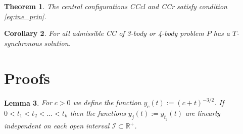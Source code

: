 \documentclass[twoside]{article}
\newtheorem{thm}{Theorem}[section]
\newtheorem{cor}[thm]{Corollary}
\newtheorem{lem}[thm]{Lemma}
\theoremstyle{remark}
\begin{document}
\begin{thm}\label{thm:CC.3.4.satis.cond.adm}
The central configurations CCcl and CCr satisfy condition \eqref{eq:ine_prin}.
\end{thm}

\begin{cor}
For all  admissible CC of 3-body or 4-body  problem $P$ has a $T$-synchronous solution.
\end{cor}




\section{Proofs}



\begin{lem}\label{lem:1} For $c>0$ we define the function $y_c(t):=(c+t)^{-3/2}$. If $0<t_1<t_2<\ldots<t_k$ then the functions $y_j(t):=y_{t_j}(t)$  are linearly independent on  each open interval   $\mathcal{I}\subset \mathbb{R}^+$.
\end{lem}
\end{document}
